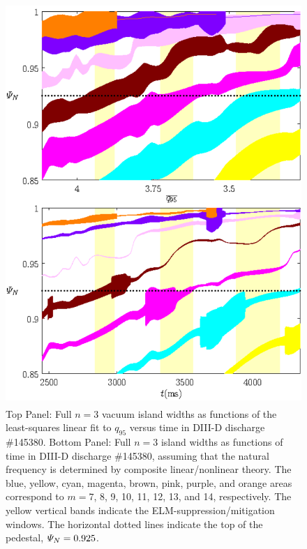 \documentclass[12pt,prb,aps]{revtex4-1}
\begin{document}
\begin{figure}
\includegraphics[height=6in]{fig10.pdf}
\caption{Top Panel: Full  $n=3$ vacuum island widths as functions of the least-squares linear fit to $q_{95}$ versus time 
in   DIII-D discharge \#145380.
Bottom Panel:  Full $n=3$ island widths as functions of time
in   DIII-D discharge \#145380, assuming that the natural frequency is determined by composite linear/nonlinear theory. The blue, yellow, cyan, magenta, brown, pink,
purple, and orange  areas correspond to $m=7$, 8, 9, 10, 11, 12, 13, and 14, respectively. The yellow vertical bands indicate the ELM-suppression/mitigation windows. 
The horizontal dotted lines indicate the top of the pedestal, ${\mit\Psi}_N=0.925$.} \label{fig10}
\end{figure}
\end{document}
